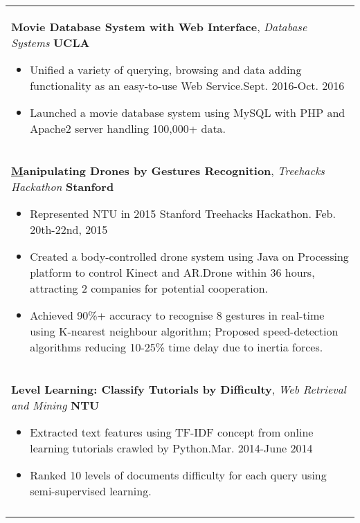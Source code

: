 \documentclass[a4paper,10pt]{article} %
\begin{document}
{\begin{tabular}{p{18.5cm}}
{\fontsize{11}{13.2}\textbf{Movie Database System with Web Interface}}, {\it{Database Systems}} \hfill \textbf{UCLA} 
\vspace{0.5mm}
\begin{itemize}
\item Unified a variety of querying, browsing and data adding functionality as an easy-to-use Web Service.\hfill Sept. 2016-Oct. 2016
\item Launched a movie database system using MySQL with PHP and Apache2 server handling 100,000+ data.\vspace*{-\baselineskip}
\end{itemize} \\
\vspace{0.5mm}

{\fontsize{11}{13.2}\textbf{{\href{https://www.youtube.com/watch?v=jxsZaQ6PcXU}Manipulating Drones by Gestures Recognition}}}, {\it{Treehacks Hackathon}} \hfill \textbf{Stanford} 
\vspace{0.5mm}
\begin{itemize}
	\item Represented NTU in 2015 Stanford Treehacks Hackathon. \hfill Feb. 20th-22nd, 2015
	\item Created a body-controlled drone system using Java on Processing platform to control Kinect and AR.Drone within 36 hours, attracting 2 companies for potential cooperation. 
	\item Achieved 90\%+ accuracy to recognise 8 gestures in real-time using K-nearest neighbour algorithm; Proposed speed-detection algorithms reducing 10-25\% time delay due to inertia forces. \vspace*{-\baselineskip}
\end{itemize} \\
\vspace{0.5mm}
	
{\fontsize{11}{13.2}\textbf{Level Learning: Classify Tutorials by Difficulty}}, {\it{Web Retrieval and Mining}} \hfill \textbf{NTU} 
\vspace{0.5mm}
\begin{itemize}
\item Extracted text features using TF-IDF concept from online learning tutorials crawled by Python.\hfill Mar. 2014-June 2014
\item Ranked 10 levels of documents difficulty for each query using semi-supervised learning.\vspace*{-\baselineskip}
\end{itemize}\\
\vspace{0.5mm}


\end{tabular}}
\end{document}
